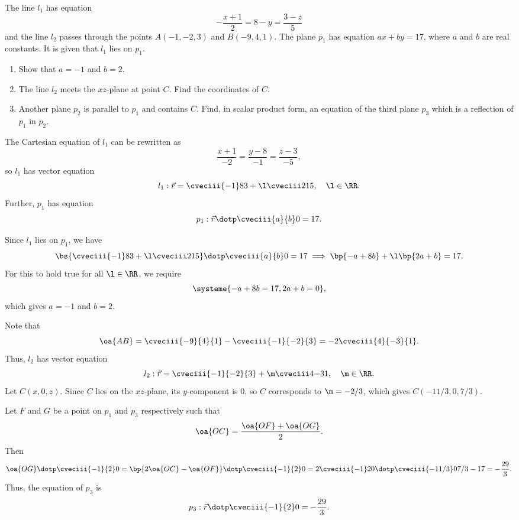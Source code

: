 \begin{problem}
    The line $l_1$ has equation \[-\frac{x+1}{2} = 8 - y = \frac{3 - z}{5}\] and the line $l_2$ passes through the points $A(-1, -2, 3)$ and $B(-9, 4, 1)$. The plane $p_1$ has equation $ax + by = 17$, where $a$ and $b$ are real constants. It is given that $l_1$ lies on $p_1$.

    \begin{enumerate}
        \item Show that $a = -1$ and $b = 2$.
        \item The line $l_2$ meets the $xz$-plane at point $C$. Find the coordinates of $C$.
        \item Another plane $p_2$ is parallel to $p_1$ and contains $C$. Find, in scalar product form, an equation of the third plane $p_3$ which is a reflection of $p_1$ in $p_2$.
    \end{enumerate}
\end{problem}
\begin{solution}
    \begin{ppart}
        The Cartesian equation of $l_1$ can be rewritten as \[\frac{x+1}{-2} = \frac{y-8}{-1} = \frac{z-3}{-5},\] so $l_1$ has vector equation \[l_1 : \vec r = \cveciii{-1}83 + \l \cveciii215, \quad \l \in \RR.\] Further, $p_1$ has equation \[p_1 : \vec r \dotp \cveciii{a}{b}0 = 17.\]

        Since $l_1$ lies on $p_1$, we have \[\bs{\cveciii{-1}83 + \l \cveciii215} \dotp \cveciii{a}{b}0 = 17 \implies \bp{-a + 8b} + \l \bp{2a + b} = 17.\] For this to hold true for all $\l \in \RR$, we require \[\systeme{-a + 8b = 17, 2a + b = 0},\] which gives $a = -1$ and $b = 2$.
    \end{ppart}
    \begin{ppart}
        Note that \[\oa{AB} = \cveciii{-9}{4}{1} - \cveciii{-1}{-2}{3} = -2\cveciii{4}{-3}{1}.\] Thus, $l_2$ has vector equation \[l_2 : \vec r = \cveciii{-1}{-2}{3} + \m \cveciii4{-3}{1}, \quad \m \in \RR.\] Let $C(x, 0, z)$. Since $C$ lies on the $xz$-plane, its $y$-component is 0, so $C$ corresponds to $\m = -2/3$, which gives $C(-11/3, 0, 7/3)$.
    \end{ppart}
    \begin{ppart}
        Let $F$ and $G$ be a point on $p_1$ and $p_3$ respectively such that \[\oa{OC} = \frac{\oa{OF} + \oa{OG}}{2}.\] Then \[\oa{OG} \dotp \cveciii{-1}{2}0 = \bp{2\oa{OC} - \oa{OF}} \dotp \cveciii{-1}{2}0 = 2 \cveciii{-1}20 \dotp \cveciii{-11/3}0{7/3} - 17 = -\frac{29}{3}.\] Thus, the equation of $p_3$ is \[p_3: \vec r \dotp \cveciii{-1}{2}0 = -\frac{29}{3}.\]
    \end{ppart}
\end{solution}